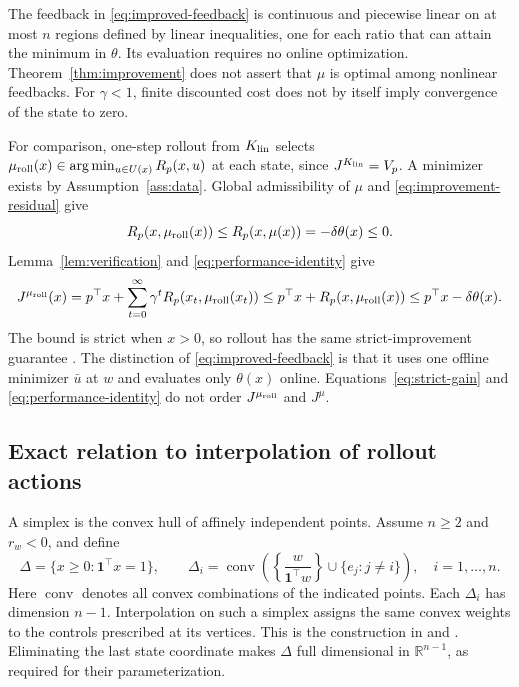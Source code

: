 \documentclass[10pt]{article}
\newcommand{\R}{\mathbb R}
\newcommand{\one}{\mathbf 1}
\begin{document}
The feedback in \eqref{eq:improved-feedback} is continuous and piecewise linear on at most $n$ regions defined by linear inequalities, one for each ratio that can attain the minimum in $\theta$. Its evaluation requires no online optimization. Theorem~\ref{thm:improvement} does not assert that $\mu$ is optimal among nonlinear feedbacks. For $\gamma<1$, finite discounted cost does not by itself imply convergence of the state to zero.

For comparison, one-step rollout from $K_{\rm lin}$ selects $\mu_{\rm roll}(x)\in\arg\min_{u\in U(x)}R_p(x,u)$ at each state, since $J^{K_{\rm lin}}=V_p$. A minimizer exists by Assumption~\ref{ass:data}. Global admissibility of $\mu$ and \eqref{eq:improvement-residual} give
\[
 R_p(x,\mu_{\rm roll}(x))\le R_p(x,\mu(x))=-\delta\theta(x)\le0.
\]
Lemma~\ref{lem:verification} and \eqref{eq:performance-identity} give
\[
 J^{\mu_{\rm roll}}(x)=p^\top x+\sum_{t=0}^\infty\gamma^tR_p(x_t,\mu_{\rm roll}(x_t))
 \le p^\top x+R_p(x,\mu_{\rm roll}(x))
 \le p^\top x-\delta\theta(x).
\]
The bound is strict when $x>0$, so rollout has the same strict-improvement guarantee \cite{li-johansson-martensson-bertsekas}. The distinction of \eqref{eq:improved-feedback} is that it uses one offline minimizer $\bar u$ at $w$ and evaluates only $\theta(x)$ online. Equations~\eqref{eq:strict-gain} and \eqref{eq:performance-identity} do not order $J^{\mu_{\rm roll}}$ and $J^\mu$.

\subsection{Exact relation to interpolation of rollout actions}

A simplex is the convex hull of affinely independent points. Assume $n\ge2$ and $r_w<0$, and define
\begin{equation}
 \Delta=\{x\ge0:\one^\top x=1\},\qquad
 \Delta_i=\operatorname{conv}\left(\left\{\frac{w}{\one^\top w}\right\}
       \cup\{e_j:j\ne i\}\right),\quad i=1,\ldots,n.
 \label{eq:interpolation-partition}
\end{equation}
Here $\operatorname{conv}$ denotes all convex combinations of the indicated points. Each $\Delta_i$ has dimension $n-1$. Interpolation on such a simplex assigns the same convex weights to the controls prescribed at its vertices. This is the construction in \cite{filippi-2004} and \cite[Section~3.1, Proposition~3.1]{bemporad-filippi-2006}. Eliminating the last state coordinate makes $\Delta$ full dimensional in $\R^{n-1}$, as required for their parameterization.
\end{document}

